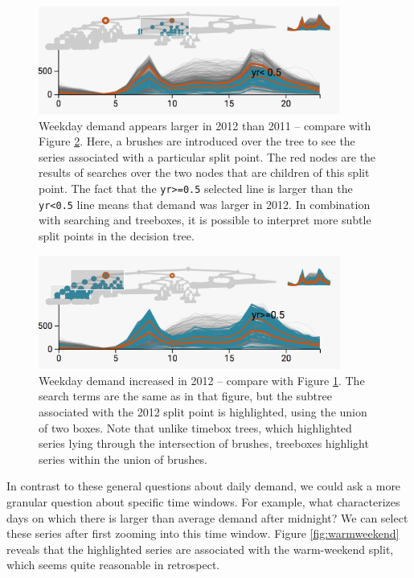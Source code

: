 \documentclass{report}
\begin{document}
\begin{figure}
  \centering
  \includegraphics[width=375px]{figure/treelapse/weekday_2011}
    \caption{Weekday demand appears larger in 2012 than 2011 -- compare with Figure 
      \ref{fig:weekday2012}. Here, a brushes are introduced over the tree to see the
      series associated with a particular split point. The red nodes are the results
      of searches over the two nodes that are children of this split point. The fact
      that the \texttt{yr>=0.5} selected line is larger than the \texttt{yr<0.5}
      line means that demand was larger in 2012. In combination with searching and
      treeboxes, it is possible to interpret more subtle split points in the decision
      tree.} \label{fig:weekday2011}
\end{figure}

\begin{figure}
  \centering
  \includegraphics[width=375px]{figure/treelapse/weekday_2012}
  \caption{Weekday demand increased in 2012 -- compare with 
    Figure \ref{fig:weekday2011}. The search terms are the same as in that figure,
    but the subtree associated with the 2012 split point is highlighted, using the
    union of two boxes. Note that unlike timebox trees, which highlighted series
    lying through the intersection of brushes, treeboxes highlight series within the
    union of brushes.}\label{fig:weekday2012}
\end{figure}

In contrast to these general questions about daily demand, we could ask
a more granular question about specific time windows. For example, what
characterizes days on which there is larger than average demand after
midnight? We can select these series after first zooming into this time window.
Figure \ref{fig:warmweekend} reveals that the highlighted series are associated
with the warm-weekend split, which seems quite reasonable in retrospect.
\end{document}
